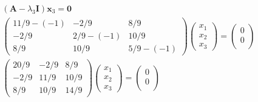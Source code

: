 \documentclass[12pt]{article}
\begin{document}
\begin{equation*}
	\begin{array}{c}
		\left(\mathbf{A}-\lambda_{3} \mathbf{I}\right) \mathbf{x}_{3}=\mathbf{0}                                            \\
		\left(\begin{array}{ccc}
				11 / 9-(-1) & -2 / 9     & 8 / 9      \\
				-2 / 9      & 2 / 9-(-1) & 10 / 9     \\
				8 / 9       & 10 / 9     & 5 / 9-(-1)
			\end{array}\right)\left(\begin{array}{l}
				x_{1} \\
				x_{2} \\
				x_{3}
			\end{array}\right)=\left(\begin{array}{l}
				0 \\
				0 \\

			\end{array}\right) \\
		\left(\begin{array}{ccc}
				20 / 9 & -2 / 9 & 8 / 9  \\
				-2 / 9 & 11 / 9 & 10 / 9 \\
				8 / 9  & 10 / 9 & 14 / 9
			\end{array}\right)\left(\begin{array}{l}
				x_{1} \\
				x_{2} \\
				x_{3}
			\end{array}\right)=\left(\begin{array}{c}
				0 \\
				0 \\

			\end{array}\right)
	\end{array}
\end{equation*}
\end{document}
